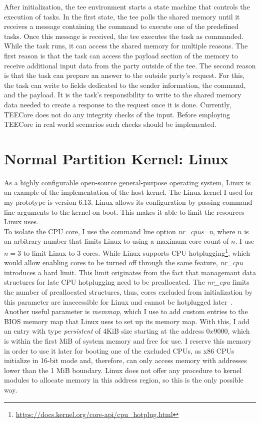 After initialization, the \gls{tee} environment starts a state machine that
controls the execution of tasks. In the first state, the \gls{tee} polls the
shared memory until it receives a message containing the command to execute one
of the predefined tasks. Once this message is received, the \gls{tee} executes
the task as commanded. While the task runs, it can access the shared memory for
multiple reasons. The first reason is that the task can access the payload
section of the memory to receive additional input data from the party outside of
the \gls{tee}. The second reason is that the task can prepare an answer to the
outside party's request. For this, the task can write to fields dedicated to the
sender information, the command, and the payload. It is the task's
responsibility to write to the shared memory data needed to create a response to
the request once it is done. Currently, TEECore does not do any integrity checks
of the input. Before employing TEECore in real world scenarios such checks
should be implemented.

\section{Normal Partition Kernel: Linux}
\label{sec:implementation:hostKernel}
As a highly configurable open-source general-purpose operating system, Linux is
an example of the implementation of the host kernel. The Linux kernel I used for
my prototype is version 6.13. Linux allows its configuration by passing command
line arguments to the kernel on boot. This makes it able to limit the resources
Linux uses. \\

To isolate the CPU core, I use the command line option \textit{nr\_cpus=n},
where $n$ is an arbitrary number that limits Linux to using a maximum core
count of $n$. I use $n=3$ to limit Linux to 3 cores. While Linux supports CPU
hotplugging\footnote{\url{https://docs.kernel.org/core-api/cpu_hotplug.html}},
which would allow enabling cores to be turned off through the same feature,
\textit{nr\_cpu} introduces a hard limit. This limit originates from the fact
that managemant data structures for late CPU hotplugging need to be
preallocated. The \textit{nr\_cpu} limits the number of preallocated structures,
thus, cores excluded from initialization by this parameter are inaccessible for
Linux and cannot be hotplugged later~\cite{kernel-parameters}. \\

Another useful parameter is \textit{memmap}, which I use to add custom entries
to the BIOS memory map that Linux uses to set up its memory map. With this, I
add an entry with type \textit{persistent} of 4KiB size starting at the address
$0x9000$, which is within the first MiB of system memory and free for use. I
reserve this memory in order to use it later for booting one of the excluded
CPUs, as x86 CPUs initialize in 16-bit mode and, therefore, can only access
memory with addresses lower than the 1 MiB boundary. Linux does not offer any
procedure to kernel modules to allocate memory in this address region, so this
is the only possible way.\\

